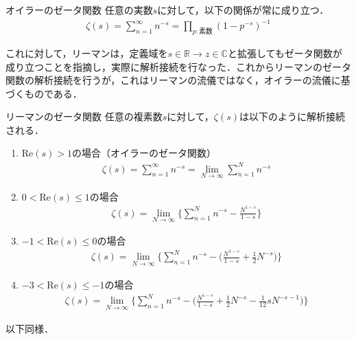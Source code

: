 \documentclass[10pt, a5paper, twoside]{ltjsarticle}
\begin{document}
            \begin{thm}{オイラーのゼータ関数}{}
                任意の実数$s$に対して，以下の関係が常に成り立つ．
                \begin{align*}
                    \zeta (s) = \sum_{n=1}^\infty n^{-s} = \prod_{p:素数} (1 - p^{-s})^{-1}
                \end{align*}
            \end{thm}

            これに対して，リーマンは，定義域を$s \in \mathbb{R} \to z \in \mathbb{C}$と拡張してもゼータ関数が成り立つことを指摘し，実際に解析接続を行なった\cite{150y}．これからリーマンのゼータ関数の解析接続を行うが，これはリーマンの流儀ではなく，オイラーの流儀に基づくものである．

            \begin{thm}{リーマンのゼータ関数}{}
                任意の複素数$s$に対して，$\zeta(s)$は以下のように解析接続される．
                \begin{enumerate}
                    \item $\mathrm{Re}(s) > 1$の場合（オイラーのゼータ関数）
                        \begin{align*}
                            \zeta (s) = \sum_{n=1}^\infty n^{-s} = \lim_{N \to \infty} \sum^N_{n=1} n^{-s}
                        \end{align*}
                    \item $0 < \mathrm{Re}(s) \leq 1$の場合
                        \begin{align*}
                            \zeta (s) = \lim_{N \to \infty} \Biggl\{ \sum^N_{n=1} n^{-s} - \frac{N^{1-s}}{1-s} \Biggr\}
                        \end{align*}
                    \item $-1 < \mathrm{Re}(s) \leq 0$の場合
                        \begin{align*}
                            \zeta (s) = \lim_{N \to \infty} \Biggl\{ \sum^N_{n=1} n^{-s} - \biggl( \frac{N^{1-s}}{1-s} + \frac{1}{2} N^{-s} \biggr) \Biggr\}
                        \end{align*}
                    \item $-3 < \mathrm{Re}(s) \leq -1$の場合
                        \begin{align*}
                            \zeta (s) = \lim_{N \to \infty} \Biggl\{ \sum^N_{n=1} n^{-s} - \biggl( \frac{N^{1-s}}{1-s} + \frac{1}{2} N^{-s} - \frac{1}{12} sN^{-s-1} \biggr) \Biggr\}
                        \end{align*}
                \end{enumerate}
                以下同様．
            \end{thm}
\end{document}
